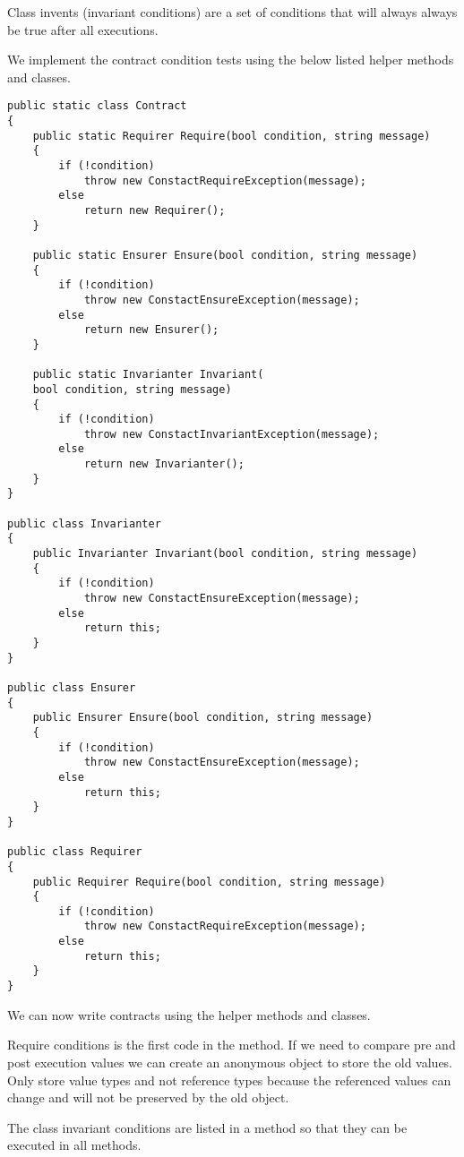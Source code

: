 Class invents (invariant conditions) are a set of conditions that will always always be true after all 
executions.

We implement the contract condition tests using the below listed helper methods 
and classes.

\begin{lstlisting}[frame=single]
public static class Contract
{
    public static Requirer Require(bool condition, string message)
    {
        if (!condition)
            throw new ConstactRequireException(message);
        else
            return new Requirer();
    }

    public static Ensurer Ensure(bool condition, string message)
    {
        if (!condition)
            throw new ConstactEnsureException(message);
        else
            return new Ensurer();
    }

    public static Invarianter Invariant(
	bool condition, string message)
    {
        if (!condition)
            throw new ConstactInvariantException(message);
        else
            return new Invarianter();
    }
}

public class Invarianter
{
    public Invarianter Invariant(bool condition, string message)
    {
        if (!condition)
            throw new ConstactEnsureException(message);
        else
            return this;
    }
}

public class Ensurer
{
    public Ensurer Ensure(bool condition, string message)
    {
        if (!condition)
            throw new ConstactEnsureException(message);
        else
            return this;
    }
}

public class Requirer
{
    public Requirer Require(bool condition, string message)
    {
        if (!condition)
            throw new ConstactRequireException(message);
        else
            return this;
    }
}
\end{lstlisting}

We can now write contracts using the helper methods and classes. 

Require conditions is the first code in the method. If we need to compare pre and 
post execution values we can create an anonymous object to store the old values. 
Only store value types and not reference types because the referenced values can
change and will not be preserved by the old object.

The class invariant conditions are listed in a method so that they can be executed
in all methods. 

